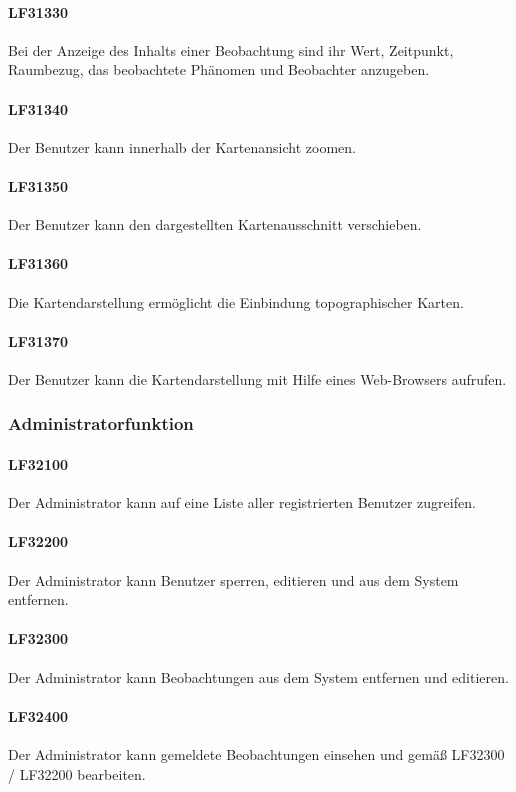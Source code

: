 \documentclass[a4paper,11pt]{scrartcl}
\begin{document}
			\paragraph{LF31330}
				Bei der Anzeige des Inhalts einer Beobachtung sind ihr Wert, Zeitpunkt, Raumbezug, das beobachtete Phänomen und Beobachter anzugeben.
			\paragraph{LF31340}
				Der Benutzer kann innerhalb der Kartenansicht zoomen.
			\paragraph{LF31350}
				Der Benutzer kann den dargestellten Kartenausschnitt verschieben.
			\paragraph{LF31360}
				Die Kartendarstellung ermöglicht die Einbindung topographischer Karten.
			\paragraph{LF31370}
				Der Benutzer kann die Kartendarstellung mit Hilfe eines Web-Browsers aufrufen.
		\subsubsection{Administratorfunktion}
			\paragraph{LF32100}
				Der Administrator kann auf eine Liste aller registrierten Benutzer zugreifen.
			\paragraph{LF32200}
				Der Administrator kann Benutzer sperren, editieren und aus dem System entfernen.
			\paragraph{LF32300}
				Der Administrator kann Beobachtungen aus dem System entfernen und editieren.
			\paragraph{LF32400}
				Der Administrator kann gemeldete Beobachtungen einsehen und gemäß LF32300 / LF32200 bearbeiten.
\end{document}
